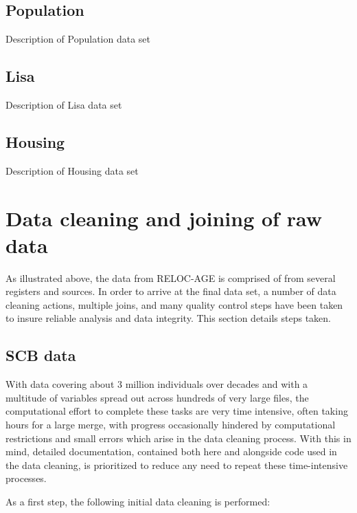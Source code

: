 \documentclass[
]{book}
\begin{document}
\hypertarget{population}{%
\section{Population}\label{population}}

Description of Population data set

\hypertarget{lisa}{%
\section{Lisa}\label{lisa}}

Description of Lisa data set

\hypertarget{housing}{%
\section{Housing}\label{housing}}

Description of Housing data set

\hypertarget{data-cleaning-and-joining-of-raw-data}{%
\chapter{Data cleaning and joining of raw data}\label{data-cleaning-and-joining-of-raw-data}}

As illustrated above, the data from RELOC-AGE is comprised of from several registers and sources. In order to arrive at the final data set, a number of data cleaning actions, multiple joins, and many quality control steps have been taken to insure reliable analysis and data integrity. This section details steps taken.

\hypertarget{scb-data}{%
\section{SCB data}\label{scb-data}}

With data covering about 3 million individuals over decades and with a multitude of variables spread out across hundreds of very large files, the computational effort to complete these tasks are very time intensive, often taking hours for a large merge, with progress occasionally hindered by computational restrictions and small errors which arise in the data cleaning process. With this in mind, detailed documentation, contained both here and alongside code used in the data cleaning, is prioritized to reduce any need to repeat these time-intensive processes.

As a first step, the following initial data cleaning is performed:
\end{document}
